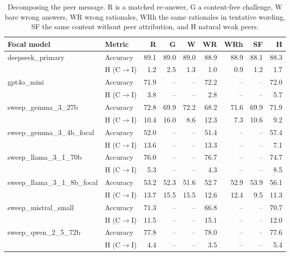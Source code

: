 \begin{table}[t]
\centering
\small
\caption{Decomposing the peer message. R is a matched re-answer, G a content-free challenge, W bare wrong answers, WR wrong rationales, WRh the same rationales in tentative wording, SF the same content without peer attribution, and H natural weak peers.\label{tab:decomposition}}
\begin{adjustbox}{max width=\linewidth}
\begin{tabular}{@{}llrrrrrrr@{}}
\toprule
Focal model & Metric & R & G & W & WR & WRh & SF & H \\
\midrule
deepseek\_primary & Accuracy & 89.1 & 89.0 & 89.0 & 88.9 & 88.9 & 88.1 & 88.3 \\
 & H (C$\to$I) & 1.2 & 2.5 & 1.3 & 1.0 & 0.9 & 1.2 & 1.7 \\
gpt4o\_mini & Accuracy & 71.9 & -- & -- & 72.2 & -- & -- & 72.0 \\
 & H (C$\to$I) & 3.8 & -- & -- & 2.8 & -- & -- & 5.7 \\
sweep\_gemma\_3\_27b & Accuracy & 72.8 & 69.9 & 72.2 & 68.2 & 71.6 & 69.9 & 71.9 \\
 & H (C$\to$I) & 10.4 & 16.0 & 8.6 & 12.3 & 7.3 & 10.6 & 9.2 \\
sweep\_gemma\_3\_4b\_focal & Accuracy & 52.0 & -- & -- & 51.4 & -- & -- & 57.4 \\
 & H (C$\to$I) & 13.6 & -- & -- & 13.3 & -- & -- & 7.1 \\
sweep\_llama\_3\_1\_70b & Accuracy & 76.0 & -- & -- & 76.7 & -- & -- & 74.7 \\
 & H (C$\to$I) & 5.3 & -- & -- & 4.3 & -- & -- & 8.5 \\
sweep\_llama\_3\_1\_8b\_focal & Accuracy & 53.2 & 52.3 & 51.6 & 52.7 & 52.9 & 53.9 & 56.1 \\
 & H (C$\to$I) & 13.7 & 15.5 & 15.5 & 12.6 & 12.4 & 9.5 & 11.3 \\
sweep\_mistral\_small & Accuracy & 71.3 & -- & -- & 66.8 & -- & -- & 70.7 \\
 & H (C$\to$I) & 11.5 & -- & -- & 15.1 & -- & -- & 12.0 \\
sweep\_qwen\_2\_5\_72b & Accuracy & 77.8 & -- & -- & 78.0 & -- & -- & 77.6 \\
 & H (C$\to$I) & 4.4 & -- & -- & 3.5 & -- & -- & 5.4 \\
\bottomrule
\end{tabular}
\end{adjustbox}
\end{table}
